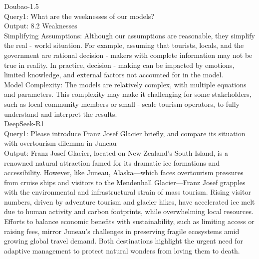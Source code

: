 \documentclass{mcmthesis}
\begin{document}




\AImatter

\begin{ReportAiUse}{9}
Doubao-1.5 \\
Query1: What are the weeknesses of our models? \\
Output: 
8.2 Weaknesses \\
Simplifying Assumptions: Although our assumptions are reasonable, they simplify the real - world situation. For example, assuming that tourists, locals, and the government are rational decision - makers with complete information may not be true in reality. In practice, decision - making can be impacted by emotions, limited knowledge, and external factors not accounted for in the model. \\
Model Complexity: The models are relatively complex, with multiple equations and parameters. This complexity may make it challenging for some stakeholders, such as local community members or small - scale tourism operators, to fully understand and interpret the results. \\

DeepSeek-R1 \\
Query1: Please introduce Franz Josef Glacier briefly, and compare its situation with overtourism dilemma in Juneau \\
Output: 
Franz Josef Glacier, located on New Zealand's South Island, is a renowned natural attraction famed for its dramatic ice formations and accessibility. 
However, like Juneau, Alaska—which faces overtourism pressures from cruise ships and visitors to the Mendenhall Glacier—Franz Josef grapples with the environmental and infrastructural strain of mass tourism. 
Rising visitor numbers, driven by adventure tourism and glacier hikes, have accelerated ice melt due to human activity and carbon footprints, while overwhelming local resources. 
Efforts to balance economic benefits with sustainability, such as limiting access or raising fees, mirror Juneau’s challenges in preserving fragile ecosystems amid growing global travel demand. 
Both destinations highlight the urgent need for adaptive management to protect natural wonders from loving them to death.

\end{ReportAiUse}
\end{document}

